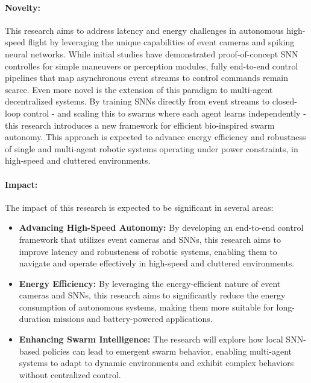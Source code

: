 \documentclass{article}
\begin{document}
\paragraph{Novelty:} This research aims to address latency and energy challenges in autonomous high-speed flight by leveraging the unique capabilities of event cameras and spiking neural networks. While initial studies have demonstrated proof-of-concept SNN controlles for simple maneuvers or perception modules, fully end-to-end control pipelines that map asynchronous event streams to control commands remain scarce. Even more novel is the extension of this paradigm to multi-agent decentralized systems. By training SNNs directly from event streams to closed-loop control - and scaling this to swarms where each agent learns independently - this research introduces a new framework for efficient bio-inspired swarm autonomy. This approach is expected to advance energy efficiency and robustness of single and multi-agent robotic systems operating under power constraints, in high-speed and cluttered environments.

\paragraph{Impact:} The impact of this research is expected to be significant in several areas:
\begin{itemize}
    \item \textbf{Advancing High-Speed Autonomy:} By developing an end-to-end control framework that utilizes event cameras and SNNs, this research aims to improve latency and robusteness of robotic systems, enabling them to navigate and operate effectively in high-speed and cluttered environments.

    \item \textbf{Energy Efficiency:} By leveraging the energy-efficient nature of event cameras and SNNs, this research aims to significantly reduce the energy consumption of autonomous systems, making them more suitable for long-duration missions and battery-powered applications.    
    
    \item \textbf{Enhancing Swarm Intelligence:} The research will explore how local SNN-based policies can lead to emergent swarm behavior, enabling multi-agent systems to adapt to dynamic environments and exhibit complex behaviors without centralized control. 

\end{itemize}

\printbibliography[heading=bibnumbered]
\end{document}
